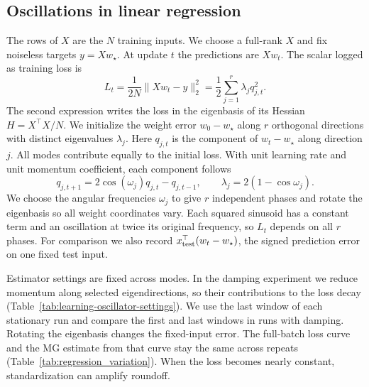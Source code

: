 {\subsection[Oscillations in linear regression]{Oscillations in linear regression}
The rows of $X$ are the $N$ training inputs. We choose a full-rank $X$ and fix noiseless targets $y=Xw_\star$. At update $t$ the predictions are $Xw_t$. The scalar logged as training loss is
\[
L_t=\frac{1}{2N}\lVert Xw_t-y\rVert_2^2
   =\frac{1}{2}\sum_{j=1}^{r}\lambda_j q_{j,t}^2.
\]
The second expression writes the loss in the eigenbasis of its Hessian $H=X^\top X/N$. We initialize the weight error $w_0-w_\star$ along $r$ orthogonal directions with distinct eigenvalues $\lambda_j$. Here $q_{j,t}$ is the component of $w_t-w_\star$ along direction $j$. All modes contribute equally to the initial loss. With unit learning rate and unit momentum coefficient, each component follows
\[
q_{j,t+1}=2\cos(\omega_j)q_{j,t}-q_{j,t-1},
\qquad \lambda_j=2(1-\cos\omega_j).
\]
We choose the angular frequencies $\omega_j$ to give $r$ independent phases and rotate the eigenbasis so all weight coordinates vary. Each squared sinusoid has a constant term and an oscillation at twice its original frequency, so $L_t$ depends on all $r$ phases. For comparison we also record $x_{\rm test}^\top(w_t-w_\star)$, the signed prediction error on one fixed test input.

\begin{table}[h]
\centering\small
\caption{Median MG estimates from the training loss and fixed-input prediction error recorded during regression with $r$ known modes.}

\end{table}

Estimator settings are fixed across modes. In the damping experiment we reduce momentum along selected eigendirections, so their contributions to the loss decay (Table~\ref{tab:learning-oscillator-settings}). We use the last window of each stationary run and compare the first and last windows in runs with damping. Rotating the eigenbasis changes the fixed-input error. The full-batch loss curve and the MG estimate from that curve stay the same across repeats (Table~\ref{tab:regression_variation}). When the loss becomes nearly constant, standardization can amplify roundoff.

\begin{table}[h]
\centering\small
\caption{MG estimates from the loss and prediction-error records before and after damping two weight oscillations. Each row summarizes the same three regression runs.}
\label{tab:regression_variation}

\end{table}

}
